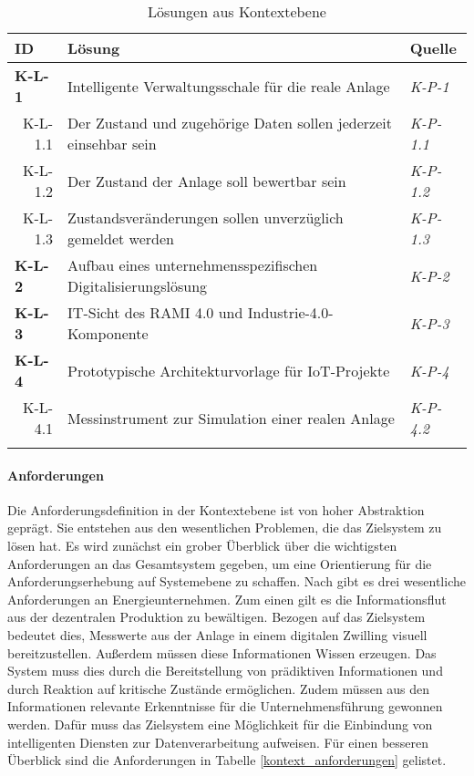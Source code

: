 \begin{table}[H]
  \begin{tabularx}{\textwidth}{@{}lXp{2cm}@{}}
      \toprule
      ID                & Lösung & Quelle \\
      \midrule
      \textbf{K-L-1}              &   Intelligente Verwaltungsschale für die reale Anlage & \textit{K-P-1}                \\
      \multicolumn{1}{r}{K-L-1.1} &  Der Zustand und zugehörige Daten sollen jederzeit einsehbar sein & \textit{K-P-1.1}\\
      \multicolumn{1}{r}{K-L-1.2} & Der Zustand der Anlage soll bewertbar sein & \textit{K-P-1.2}\\
      \multicolumn{1}{r}{K-L-1.3} & Zustandsveränderungen sollen unverzüglich gemeldet werden & \textit{K-P-1.3}\\
      \textbf{K-L-2}              & Aufbau eines unternehmensspezifischen Digitalisierungslösung    & \textit{K-P-2}                \\
      \textbf{K-L-3}              & IT-Sicht des RAMI 4.0 und Industrie-4.0-Komponente           & \textit{K-P-3}                \\
      \textbf{K-L-4}              &  Prototypische Architekturvorlage für IoT-Projekte & \textit{K-P-4} \\
      \multicolumn{1}{r}{K-L-4.1} &  Messinstrument zur Simulation einer realen Anlage & \textit{K-P-4.2}\\
      \addlinespace
      \bottomrule
  \end{tabularx}
  \label{kontext_losung}
  \caption{Lösungen aus Kontextebene}
\end{table}

\paragraph{Anforderungen}

Die Anforderungsdefinition in der Kontextebene ist von hoher Abstraktion geprägt. Sie entstehen aus den wesentlichen Problemen, die das Zielsystem zu lösen hat. Es wird zunächst ein grober Überblick über die wichtigsten Anforderungen an das Gesamtsystem gegeben, um eine Orientierung für die Anforderungserhebung auf Systemebene zu schaffen. Nach \citet{Doleski2016} gibt es drei wesentliche Anforderungen an Energieunternehmen. Zum einen gilt es die Informationsflut aus der dezentralen Produktion zu bewältigen. Bezogen auf das Zielsystem bedeutet dies, Messwerte aus der Anlage in einem digitalen Zwilling visuell bereitzustellen. Außerdem müssen diese Informationen Wissen erzeugen. Das System muss dies durch die Bereitstellung von prädiktiven Informationen und durch Reaktion auf kritische Zustände ermöglichen. Zudem müssen aus den Informationen relevante Erkenntnisse für die Unternehmensführung gewonnen werden. Dafür muss das Zielsystem eine Möglichkeit für die Einbindung von intelligenten Diensten zur Datenverarbeitung aufweisen. Für einen besseren Überblick sind die Anforderungen in Tabelle \ref{kontext_anforderungen} gelistet.

